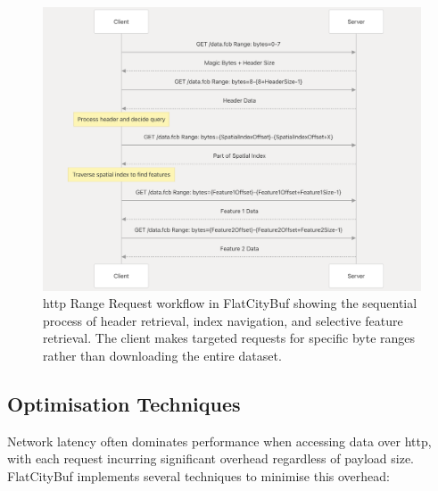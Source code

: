 \begin{figure}[htbp]
  \centering
  \includegraphics[width=1.0\textwidth]{figs/methodology/http_range.png}
  \caption{\ac{http} Range Request workflow in FlatCityBuf showing the sequential process of header retrieval, index navigation, and selective feature retrieval. The client makes targeted requests for specific byte ranges rather than downloading the entire dataset.}
  \label{fig:methodology:http_range_requests:range_request_workflow}
\end{figure}

\subsection{Optimisation Techniques}
\label{methodology:http_range_requests:range_request_optimisations}

Network latency often dominates performance when accessing data over \ac{http}, with each request incurring significant overhead regardless of payload size. FlatCityBuf implements several techniques to minimise this overhead:

